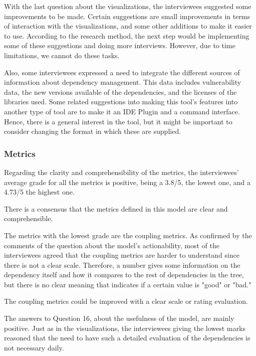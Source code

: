 With the last question about the visualizations, the interviewees suggested some improvements to be made. Certain suggestions are small improvements in terms of interaction with the visualizations, and some other additions to make it easier to use. According to the research method, the next step would be implementing some of these suggestions and doing more interviews. However, due to time limitations, we cannot do these tasks.

Also, some interviewees expressed a need to integrate the different sources of information about dependency management. This data includes vulnerability data, the new versions available of the dependencies, and the licenses of the libraries used. Some related suggestions into making this tool's features into another type of tool are to make it an IDE Plugin and a command interface. Hence, there is a general interest in the tool, but it might be important to consider changing the format in which these are supplied.


\subsubsection{Metrics}
Regarding the clarity and comprehensibility of the metrics, the interviewees' average grade for all the metrics is positive, being a 3.8/5, the lowest one, and a 4.73/5 the highest one.

\begin{finding}
	There is a consensus that the metrics defined in this model are clear and comprehensible.
	\label{find:clear-comprehensible}
\end{finding}

The metrics with the lowest grade are the coupling metrics. As confirmed by the comments of the question about the model's actionability, most of the interviewees agreed that the coupling metrics are harder to understand since there is not a clear scale. Therefore, a number gives some information on the dependency itself and how it compares to the rest of dependencies in the tree, but there is no clear meaning that indicates if a certain value is "good" or "bad."

\begin{finding}
	The coupling metrics could be improved with a clear scale or rating evaluation.
	\label{find:coupling-scale}
\end{finding}

The answers to Question 16, about the usefulness of the model, are mainly positive. Just as in the visualizations, the interviewees giving the lowest marks reasoned that the need to have such a detailed evaluation of the dependencies is not necessary daily.

